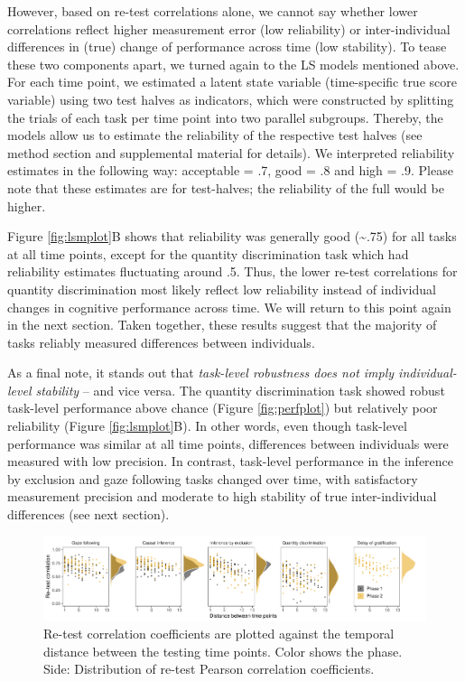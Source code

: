 \documentclass[
  man,floatsintext]{apa6}
\begin{document}
However, based on re-test correlations alone, we cannot say whether lower correlations reflect higher measurement error (low reliability) or inter-individual differences in (true) change of performance across time (low stability). To tease these two components apart, we turned again to the LS models mentioned above. For each time point, we estimated a latent state variable (time-specific true score variable) using two test halves as indicators, which were constructed by splitting the trials of each task per time point into two parallel subgroups. Thereby, the models allow us to estimate the reliability of the respective test halves (see method section and supplemental material for details). We interpreted reliability estimates in the following way: acceptable = .7, good = .8 and high = .9. Please note that these estimates are for test-halves; the reliability of the full would be higher.

Figure \ref{fig:lsmplot}B shows that reliability was generally good (\textasciitilde.75) for all tasks at all time points, except for the quantity discrimination task which had reliability estimates fluctuating around .5. Thus, the lower re-test correlations for quantity discrimination most likely reflect low reliability instead of individual changes in cognitive performance across time. We will return to this point again in the next section. Taken together, these results suggest that the majority of tasks reliably measured differences between individuals.

As a final note, it stands out that \emph{task-level robustness does not imply individual-level stability} -- and vice versa. The quantity discrimination task showed robust task-level performance above chance (Figure \ref{fig:perfplot}) but relatively poor reliability (Figure \ref{fig:lsmplot}B). In other words, even though task-level performance was similar at all time points, differences between individuals were measured with low precision. In contrast, task-level performance in the inference by exclusion and gaze following tasks changed over time, with satisfactory measurement precision and moderate to high stability of true inter-individual differences (see next section).

\begin{figure}
\includegraphics[width=1\linewidth]{./figures/reliability2} \caption{Re-test correlation coefficients are plotted against the temporal distance between the testing time points. Color shows the phase. Side: Distribution of re-test Pearson correlation coefficients.}\label{fig:relplot}
\end{figure}
\end{document}
